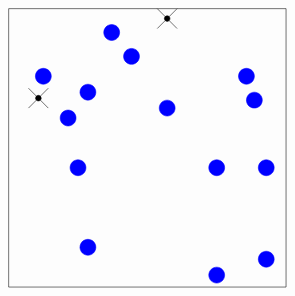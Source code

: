 \[
\begin{tikzpicture}
    \begin{scope}[yshift=-7.5cm, xshift=7.5cm]
        \draw (-3.5, 3.5 ) -- (3.5, 3.5);
        \draw (-3.5, -3.5) -- (3.5, -3.5);
        \draw (-3.5, -3.5) -- (-3.5, 3.5);
        \draw (3.5, 3.5) -- (3.5, -3.5);

        \draw[blue, fill=blue] (-1.5, -2.5) circle (0.2);
        \draw[blue, fill=blue] (-1.75, -0.5) circle (0.2);
        \draw[blue, fill=blue] (-1.5, 1.4) circle (0.2);
        \draw[blue, fill=blue] (-2, 0.75) circle (0.2);
        \draw[blue, fill=blue] (-2.625, 1.8) circle (0.2);
        \draw[blue, fill=blue] (1.75, -3.2) circle (0.2);
        \draw[blue, fill=blue] (3, -2.8) circle (0.2);
        \draw[blue, fill=blue] (3, -0.5) circle (0.2);
        \draw[blue, fill=blue] (1.75, -0.5) circle (0.2);
        \draw[blue, fill=blue] (2.7, 1.2) circle (0.2);
        \draw[blue, fill=blue] (2.5, 1.8) circle (0.2);
        \draw[blue, fill=blue] (0.5, 1) circle (0.2);
        \draw[blue, fill=blue] (-0.4, 2.3) circle (0.2);
        \draw[blue, fill=blue] (-0.9, 2.9) circle (0.2); 
        \draw[black] (-3, 1.5) -- (-2.5, 1);
        \draw[black] (-3, 1) -- (-2.5, 1.5);
        \draw[black] (0.25, 3) -- (0.75, 3.5);
        \draw[black] (0.25, 3.5) -- (0.75, 3);
        \filldraw[black](0.5, 3.25) circle (2pt);
        \filldraw[black] (-2.75 , 1.25) circle (2pt);
    \end{scope}
\end{tikzpicture}
\]

